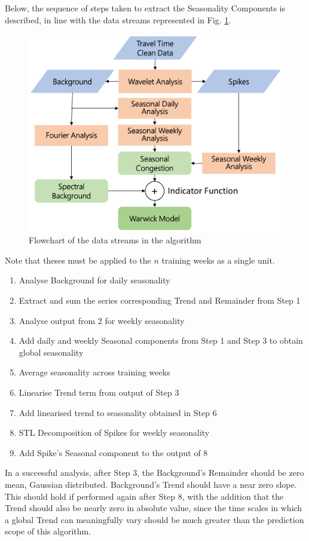 \documentclass[a4paper, 10pt, conference]{ieeeconf}      %
\begin{document}
Below, the sequence of steps taken to extract the Seasonality Components is described, in line with the data streams represented in Fig. \ref{fig:dataflow}.
\begin{figure}[htbp]
	\centerline{\includegraphics[width=\linewidth]{./images/flow_crop.pdf}}
	\caption{Flowchart of the data streams in the algorithm}
	\label{fig:dataflow}
\end{figure}
 
Note that theses must be applied to the $n$ training weeks as a single unit.
\begin{enumerate}
	\item Analyse Background for daily seasonality
	\item Extract and sum the series corresponding Trend and Remainder from Step 1
	\item Analyse output from 2 for weekly seasonality
	\item Add daily and weekly Seasonal components from Step 1 and Step 3 to obtain global seasonality
	\item Average seasonality across training weeks
	\item Linearise Trend term from output of Step 3
	\item Add linearised trend to seasonality obtained in Step 6
	\item STL Decomposition of Spikes for weekly seasonality
	\item Add Spike's Seasonal component to the output of 8
\end{enumerate}
In a successful analysis, after Step 3, the Background's Remainder should be zero mean, Gaussian distributed.
Background's Trend should have a near zero slope. This should hold if performed again after Step 8, with the addition that the Trend should also be nearly zero in absolute value, since the time scales in which a global Trend can meaningfully vary should be much greater than the prediction scope of this algorithm.
\end{document}
